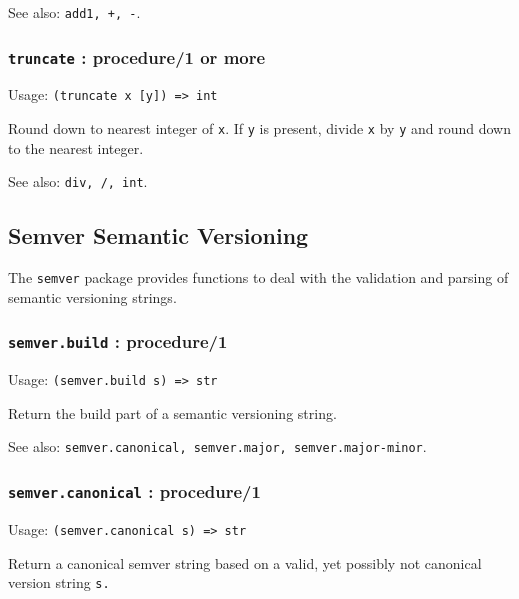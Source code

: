 \documentclass[
]{article}
\newcommand{\passthrough}[1]{#1}
\begin{document}
See also: \passthrough{\lstinline!add1, +, -!}.

\hypertarget{truncate-procedure1-or-more}{%
\subsubsection{\texorpdfstring{\texttt{truncate} : procedure/1 or
more}{truncate : procedure/1 or more}}\label{truncate-procedure1-or-more}}

Usage: \passthrough{\lstinline!(truncate x [y]) => int!}

Round down to nearest integer of \passthrough{\lstinline!x!}. If
\passthrough{\lstinline!y!} is present, divide
\passthrough{\lstinline!x!} by \passthrough{\lstinline!y!} and round
down to the nearest integer.

See also: \passthrough{\lstinline!div, /, int!}.

\hypertarget{semver-semantic-versioning}{%
\subsection{Semver Semantic
Versioning}\label{semver-semantic-versioning}}

The \passthrough{\lstinline!semver!} package provides functions to deal
with the validation and parsing of semantic versioning strings.

\hypertarget{semver.build-procedure1}{%
\subsubsection{\texorpdfstring{\texttt{semver.build} :
procedure/1}{semver.build : procedure/1}}\label{semver.build-procedure1}}

Usage: \passthrough{\lstinline!(semver.build s) => str!}

Return the build part of a semantic versioning string.

See also:
\passthrough{\lstinline!semver.canonical, semver.major, semver.major-minor!}.

\hypertarget{semver.canonical-procedure1}{%
\subsubsection{\texorpdfstring{\texttt{semver.canonical} :
procedure/1}{semver.canonical : procedure/1}}\label{semver.canonical-procedure1}}

Usage: \passthrough{\lstinline!(semver.canonical s) => str!}

Return a canonical semver string based on a valid, yet possibly not
canonical version string \passthrough{\lstinline!s.!}
\end{document}
